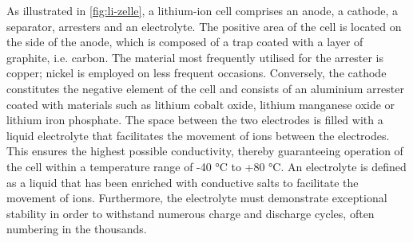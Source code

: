 As illustrated in \ref{fig:li-zelle}, a lithium-ion cell comprises an anode, a cathode, a separator, arresters and an electrolyte. The positive area of the cell is located on the side of the anode, which is composed of a trap coated with a layer of graphite, i.e. carbon. The material most frequently utilised for the arrester is copper; nickel is employed on less frequent occasions. Conversely, the cathode constitutes the negative element of the cell and consists of an aluminium arrester coated with materials such as lithium cobalt oxide, lithium manganese oxide or lithium iron phosphate. The space between the two electrodes is filled with a liquid electrolyte that facilitates the movement of ions between the electrodes. This ensures the highest possible conductivity, thereby guaranteeing operation of the cell within a temperature range of -40 °C to +80 °C.\autocite{Lith-Akku}
An electrolyte is defined as a liquid that has been enriched with conductive salts to facilitate the movement of ions. Furthermore, the electrolyte must demonstrate exceptional stability in order to withstand numerous charge and discharge cycles, often numbering in the thousands.\autocite[S.61f.]{Korthauer.2013}
